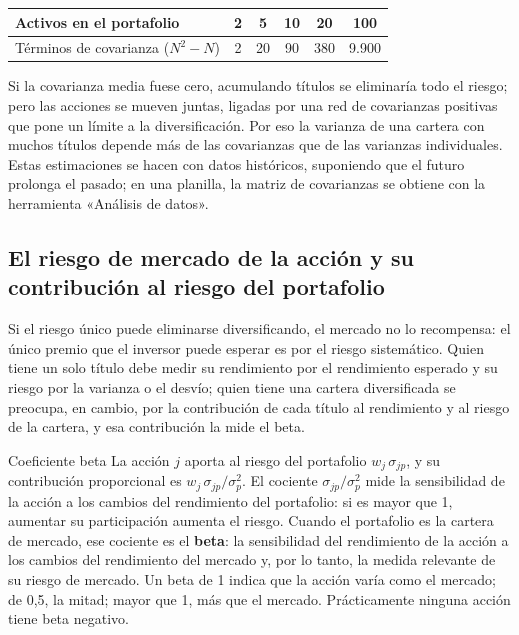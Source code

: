 \begin{center}
\small
\begin{tabular}{@{}lccccc@{}}
\toprule
Activos en el portafolio & 2 & 5 & 10 & 20 & 100\\
\midrule
Términos de covarianza ($N^{2}-N$) & 2 & 20 & 90 & 380 & 9.900\\
\bottomrule
\end{tabular}
\end{center}

Si la covarianza media fuese cero, acumulando títulos se eliminaría todo el riesgo; pero las acciones se mueven juntas, ligadas por una red de covarianzas positivas que pone un límite a la diversificación. Por eso la varianza de una cartera con muchos títulos depende más de las covarianzas que de las varianzas individuales. Estas estimaciones se hacen con datos históricos, suponiendo que el futuro prolonga el pasado; en una planilla, la matriz de covarianzas se obtiene con la herramienta «Análisis de datos».

\subsection{El riesgo de mercado de la acción y su contribución al riesgo del portafolio}

Si el riesgo único puede eliminarse diversificando, el mercado no lo recompensa: el único premio que el inversor puede esperar es por el riesgo sistemático. Quien tiene un solo título debe medir su rendimiento por el rendimiento esperado y su riesgo por la varianza o el desvío; quien tiene una cartera diversificada se preocupa, en cambio, por la contribución de cada título al rendimiento y al riesgo de la cartera, y esa contribución la mide el beta.

\begin{definicion}{Coeficiente beta}
La acción $j$ aporta al riesgo del portafolio $w_j\,\sigma_{jp}$, y su contribución proporcional es $w_j\,\sigma_{jp}/\sigma_p^{2}$. El cociente $\sigma_{jp}/\sigma_p^{2}$ mide la sensibilidad de la acción a los cambios del rendimiento del portafolio: si es mayor que 1, aumentar su participación aumenta el riesgo. Cuando el portafolio es la cartera de mercado, ese cociente es el \textbf{beta}: la sensibilidad del rendimiento de la acción a los cambios del rendimiento del mercado y, por lo tanto, la medida relevante de su riesgo de mercado. Un beta de 1 indica que la acción varía como el mercado; de 0,5, la mitad; mayor que 1, más que el mercado. Prácticamente ninguna acción tiene beta negativo.
\end{definicion}

